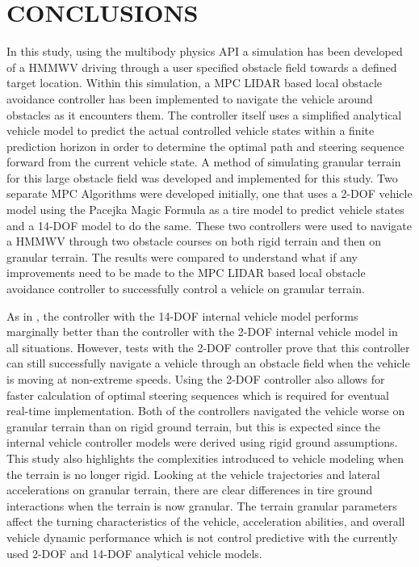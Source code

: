 \documentclass[12pt,onecolumn]{report}
\newcommand{\CHRONO}{{\sffamily{{Chrono}}}}
\begin{document}

\chapter{CONCLUSIONS}\label{c:conclusion}

In this study, using the multibody physics API {\CHRONO} a simulation has been developed of a HMMWV driving through a user specified obstacle field towards a defined target location. Within this simulation, a MPC LIDAR based local obstacle avoidance controller has been implemented to navigate the vehicle around obstacles as it encounters them. The controller itself uses a simplified analytical vehicle model to predict the actual controlled {\CHRONO} vehicle states within a finite prediction horizon in order to determine the optimal path and steering sequence forward from the current vehicle state. A method of simulating granular terrain for this large obstacle field was developed and implemented for this study. Two separate MPC Algorithms were developed initially, one that uses a 2-DOF vehicle model using the Pacejka Magic Formula as a tire model to predict {\CHRONO} vehicle states and a 14-DOF model to do the same. These two controllers were used to navigate a {\CHRONO} HMMWV through two obstacle courses on both rigid terrain and then on granular terrain. The results were compared to understand what if any improvements need to be made to the MPC LIDAR based local obstacle avoidance controller to successfully control a vehicle on granular terrain. 

As in \cite{ModelFidelity2016}, the controller with the 14-DOF internal vehicle model performs marginally better than the controller with the 2-DOF internal vehicle model in all situations. However, tests with the 2-DOF controller prove that this controller can still successfully navigate a vehicle through an obstacle field when the vehicle is moving at non-extreme speeds. Using the 2-DOF controller also allows for faster calculation of optimal steering sequences which is required for eventual real-time implementation. Both of the controllers navigated the vehicle worse on granular terrain than on rigid ground terrain, but this is expected since the internal vehicle controller models were derived using rigid ground assumptions. This study also highlights the complexities introduced to vehicle modeling when the terrain is no longer rigid. Looking at the vehicle trajectories and lateral accelerations on granular terrain, there are clear differences in tire ground interactions when the terrain is now granular. The terrain granular parameters affect the turning characteristics of the vehicle, acceleration abilities, and overall vehicle dynamic performance which is not control predictive with the currently used 2-DOF and 14-DOF analytical vehicle models. 
\end{document}
